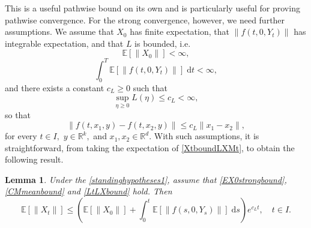 \documentclass[reqno,12pt]{amsart}
\theoremstyle{plain} %
\newtheorem{lemma}{Lemma}[section]
\theoremstyle{definition} %
\begin{document}
This is a useful pathwise bound on its own and is particularly useful for proving pathwise convergence. For the strong convergence, however, we need further assumptions. We assume that $X_0$ has finite expectation, that $\|f(t, 0, Y_t)\|$ has integrable expectation, and that $L$ is bounded, i.e.
\begin{equation}
    \label{EX0strongbound}
    \mathbb{E}[\|X_0\|] < \infty,
\end{equation}
\begin{equation}
    \label{CMmeanbound}
    \int_0^T \mathbb{E}\left[\|f(t, 0, Y_t)\|\right] \;\mathrm{d}t < \infty,
\end{equation}
and there exists a constant $c_L \geq 0$ such that
\begin{equation}
    \label{LtLXbound}
    \sup_{\eta \geq 0} L(\eta) \leq c_L < \infty,
\end{equation}
so that
\begin{equation}
    \|f(t, x_1, y) - f(t, x_2, y)\| \leq c_L \|x_1 - x_2\|,
\end{equation}
for every $t\in I,$ $y\in\mathbb{R}^k,$ and $x_1, x_2 \in\mathbb{R}^d.$ With such assumptions, it is straightforward, from taking the expectation of \cref{XtboundLXMt}, to obtain the following result.

\begin{lemma}
    \label{lemstrongbound}
    Under the \cref{standinghypotheses1}, assume that \cref{EX0strongbound}, \cref{CMmeanbound} and \cref{LtLXbound} hold. Then
    \begin{equation}
        \label{EXtstrongbound}
        \mathbb{E}[\|X_t\|] \leq \left(\mathbb{E}[\|X_0\|] + \int_0^t \mathbb{E}[\|f(s, 0, Y_s)\|]\;\mathrm{d}s\right) e^{c_L t}, \quad t\in I.
    \end{equation}
\end{lemma}
\end{document}
